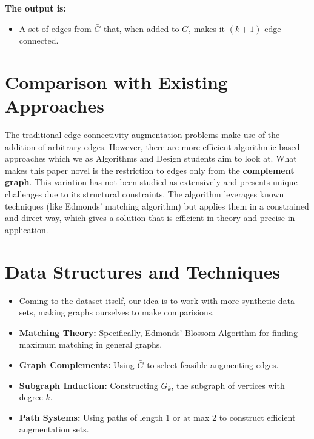 \documentclass[12pt]{article}
\begin{document}
\textbf{The output is:}
\begin{itemize}
    \item A set of edges from $\bar{G}$ that, when added to $G$, makes it $(k+1)$-edge-connected.
\end{itemize}


\section*{Comparison with Existing Approaches}
The traditional edge-connectivity augmentation problems make use of the addition of arbitrary edges. However, there are more efficient algorithmic-based approaches which we as Algorithms and Design students aim to look at.  What makes this paper novel is the restriction to edges only from the \textbf{complement graph}. This variation has not been studied as extensively and presents unique challenges due to its structural constraints. The algorithm leverages known techniques (like Edmonds' matching algorithm) but applies them in a constrained and direct way, which gives a solution that is efficient in theory and precise in application. 

\section*{Data Structures and Techniques}
\begin{itemize}
    \item Coming to the dataset itself, our idea is to work with more synthetic data sets, making graphs ourselves to make comparisions.
    \item \textbf{Matching Theory:} Specifically, Edmonds' Blossom Algorithm for finding maximum matching in general graphs.
    \item \textbf{Graph Complements:} Using $\bar{G}$ to select feasible augmenting edges.
    \item \textbf{Subgraph Induction:} Constructing $G_k$, the subgraph of vertices with degree $k$.
    \item \textbf{Path Systems:} Using paths of length 1 or at max 2 to construct efficient augmentation sets.
\end{itemize}
\end{document}
